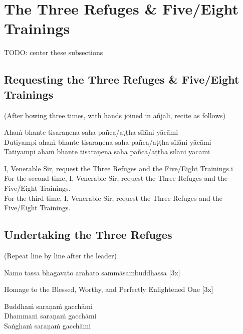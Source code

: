 \section*{The Three Refuges \& Five/Eight Trainings}
TODO: center these subsections
\subsection{Requesting the Three Refuges \& Five/Eight Trainings}

\begin{center}
(After bowing three times, with hands joined in añjali, recite as follows)\\
\end{center}

Ahaṁ bhante tisaraṇena saha pañca/aṭṭha sīlāni yācāmi\\
Dutiyampi ahaṁ bhante tisaraṇena saha pañca/aṭṭha sīlāni yācāmi\\
Tatiyampi ahaṁ bhante tisaraṇena saha pañca/aṭṭha sīlāni yācāmi\\

\begin{english}
I, Venerable Sir, request the Three Refuges and the Five/Eight Trainings.i\\
For the second time, I, Venerable Sir, request the Three Refuges and the Five/Eight Trainings.\\
For the third time, I, Venerable Sir, request the Three Refuges and the Five/Eight Trainings.
\end{english}

\subsection*{Undertaking the Three Refuges}

\begin{center}
(Repeat line by line after the leader)\\
\end{center}

Namo tassa bhagavato arahato sammāsambuddhassa \hfill{[3x]}\\

\begin{english}
Homage to the Blessed, Worthy, and Perfectly Enlightened One \hfill{[3x]}\\
\end{english}

Buddhaṁ saraṇaṁ gacchāmi\\
Dhammaṁ saraṇaṁ gacchāmi\\
Saṅghaṁ saraṇaṁ gacchāmi\\

